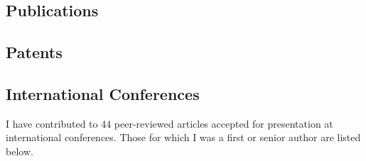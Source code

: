 \documentclass[]{mbcv}
\begin{document}
{\begin{refsection}
\nocite{*}
\section{Publications}
\vspace*{10pt}
\printbibliography[heading=none]
\end{refsection}
\begin{refsection}
\nocite{*}
\section{Patents}
\vspace*{10pt}
\printbibliography[heading=none]
\end{refsection}
\begin{refsection}
\nocite{*}
\section{International Conferences}
\vspace*{10pt}
\begin{flushleft}
I have contributed to 44 peer-reviewed articles accepted for presentation at international conferences.  Those for which I was a first or senior author are listed below.
\end{flushleft}
\printbibliography[heading=none]
\end{refsection}
\clearpage
\restoregeometry
}
%
%
%
%
\end{document}
